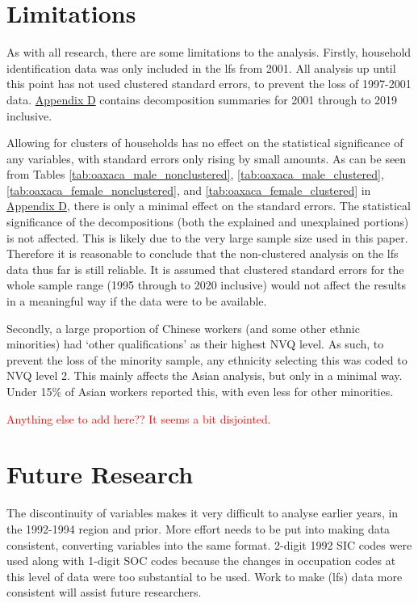 \documentclass[class=article, crop=false]{standalone}
\begin{document}
\section{Limitations}
\label{sec:limitations}
As with all research, there are some limitations to the analysis. Firstly, household identification data was only included in the \acrlong{lfs} from 2001. All analysis up until this point has not used clustered standard errors, to prevent the loss of 1997-2001 data. \hyperref[sec:appendixA]{Appendix D} contains decomposition summaries for 2001 through to 2019 inclusive. 

Allowing for clusters of households has no effect on the statistical significance of any variables, with standard errors only rising by small amounts. As can be seen from Tables \ref{tab:oaxaca_male_nonclustered}, \ref{tab:oaxaca_male_clustered},  \ref{tab:oaxaca_female_nonclustered}, and \ref{tab:oaxaca_female_clustered} in \hyperref[sec:appendixD]{Appendix D}, there is only a minimal effect on the standard errors. The statistical significance of the decompositions (both the explained and unexplained portions) is not affected. This is likely due to the very large sample size used in this paper. Therefore it is reasonable to conclude that the non-clustered analysis on the \acrshort{lfs} data thus far is still reliable. It is assumed that clustered standard errors for the whole sample range (1995 through to 2020 inclusive) would not affect the results in a meaningful way if the data were to be available.

Secondly, a large proportion of Chinese workers (and some other ethnic minorities) had \enquote*{other qualifications} as their highest NVQ level. As such, to prevent the loss of the minority sample, any ethnicity selecting this was coded to NVQ level 2. This mainly affects the Asian analysis, but only in a minimal way. Under 15\% of Asian workers reported this, with even less for other minorities.

\textcolor{red}{Anything else to add here?? It seems a bit disjointed.}

\section{Future Research}
\label{sec:Future Research}
The discontinuity of variables makes it very difficult to analyse earlier years, in the 1992-1994 region and prior. More effort needs to be put into making data consistent, converting variables into the same format. 2-digit 1992 SIC codes were used along with 1-digit SOC codes because the changes in occupation codes at this level of data were too substantial to be used. Work to make (\acrshort{lfs}) data more consistent will assist future researchers.
\end{document}
